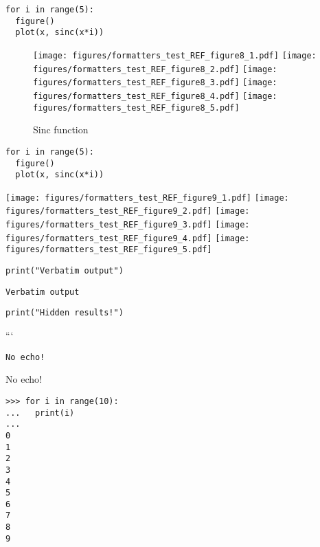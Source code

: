 \begin{verbatim}
for i in range(5):
  figure()
  plot(x, sinc(x*i))
\end{verbatim}
\begin{sidefigure}
\begin{figure}[htpb]
\center
\texttt{[image: figures/formatters\_test\_REF\_figure8\_1.pdf]}
\texttt{[image: figures/formatters\_test\_REF\_figure8\_2.pdf]}
\texttt{[image: figures/formatters\_test\_REF\_figure8\_3.pdf]}
\texttt{[image: figures/formatters\_test\_REF\_figure8\_4.pdf]}
\texttt{[image: figures/formatters\_test\_REF\_figure8\_5.pdf]}
\caption{Sinc function}
\label{fig:None}
\end{figure}
\end{sidefigure}



\begin{verbatim}
for i in range(5):
  figure()
  plot(x, sinc(x*i))
\end{verbatim}
\texttt{[image: figures/formatters\_test\_REF\_figure9\_1.pdf]}
\texttt{[image: figures/formatters\_test\_REF\_figure9\_2.pdf]}
\texttt{[image: figures/formatters\_test\_REF\_figure9\_3.pdf]}
\texttt{[image: figures/formatters\_test\_REF\_figure9\_4.pdf]}
\texttt{[image: figures/formatters\_test\_REF\_figure9\_5.pdf]}




\begin{verbatim}
print("Verbatim output")
\end{verbatim}
\begin{verbatim}
Verbatim output

\end{verbatim}



\begin{verbatim}
print("Hidden results!")
\end{verbatim}


```


\begin{verbatim}
No echo!

\end{verbatim}



No echo!




\begin{verbatim}
>>> for i in range(10):
...   print(i)
...
0
1
2
3
4
5
6
7
8
9

\end{verbatim}



